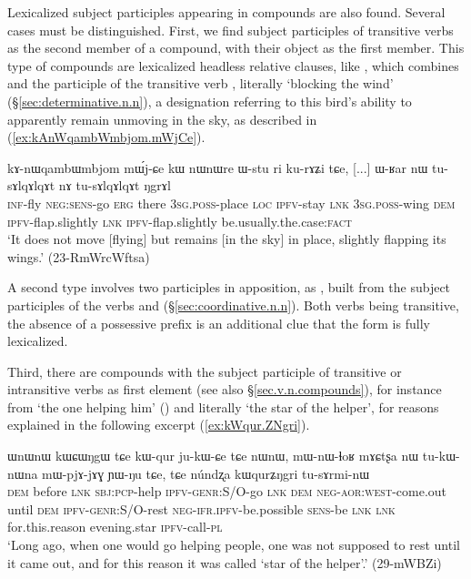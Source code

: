Lexicalized subject participles appearing in compounds are also found. Several cases must be distinguished. First, we find subject participles of transitive verbs as the second member of a compound, with their object as the first member. This type of compounds are lexicalized headless relative clauses, like , which combines   and the participle   of the transitive verb , literally `blocking the wind'   (§\ref{sec:determinative.n.n}), a designation referring to this bird's ability to apparently remain unmoving in the sky, as described in (\ref{ex:kAnWqambWmbjom.mWjCe}).

\begin{exe}
\ex \label{ex:kAnWqambWmbjom.mWjCe}
 \gll  kɤ-nɯqambɯmbjom mɯ́j-ɕe kɯ nɯnɯre ɯ-stu ri ku-rɤʑi tɕe, [...] ɯ-ʁar nɯ tu-sɤlqɤlqɤt nɤ tu-sɤlqɤlqɤt ŋgrɤl  \\
 \textsc{inf}-fly \textsc{neg}:\textsc{sens}-go \textsc{erg} there \textsc{3sg}.\textsc{poss}-place \textsc{loc} \textsc{ipfv}-stay \textsc{lnk} { } \textsc{3sg}.\textsc{poss}-wing \textsc{dem} \textsc{ipfv}-flap.slightly \textsc{lnk}  \textsc{ipfv}-flap.slightly be.usually.the.case:\textsc{fact} \\
 \glt `It does not move [flying] but remains [in the sky] in place, slightly flapping its wings.' (23-RmWrcWftsa)
\end{exe}

A second type involves two participles in apposition, as , built from the subject participles of the verbs  and   (§\ref{sec:coordinative.n.n}). Both verbs being transitive, the absence of a possessive prefix  is an additional clue that the form is fully lexicalized.

Third, there are compounds with the subject participle of transitive or intransitive verbs as first element (see also §\ref{sec.v.n.compounds}), for instance  from  `the one helping him' () and  literally `the star of the helper', for reasons explained in the following excerpt (\ref{ex:kWqur.ZNgri}).

\begin{exe}
\ex \label{ex:kWqur.ZNgri}
\gll ɯnɯnɯ kɯɕɯŋgɯ tɕe kɯ-qur ju-kɯ-ɕe tɕe nɯnɯ, mɯ-nɯ-ɬoʁ mɤɕtʂa nɯ tu-kɯ-nɯna mɯ-pjɤ-jɤɣ ɲɯ-ŋu tɕe,  tɕe núndʐa kɯqurʑŋgri tu-sɤrmi-nɯ \\
\textsc{dem} before \textsc{lnk} \textsc{sbj}:\textsc{pcp}-help \textsc{ipfv}-\textsc{genr}:S/O-go \textsc{lnk} \textsc{dem} \textsc{neg}-\textsc{aor}:\textsc{west}-come.out until \textsc{dem} \textsc{ipfv}-\textsc{genr}:S/O-rest \textsc{neg}-\textsc{ifr}.\textsc{ipfv}-be.possible \textsc{sens}-be \textsc{lnk} \textsc{lnk} for.this.reason evening.star \textsc{ipfv}-call-\textsc{pl} \\
\glt `Long ago, when one would go helping people, one was not supposed to rest until it came out, and for this reason it was called `star of the helper'.' (29-mWBZi)
\end{exe}

